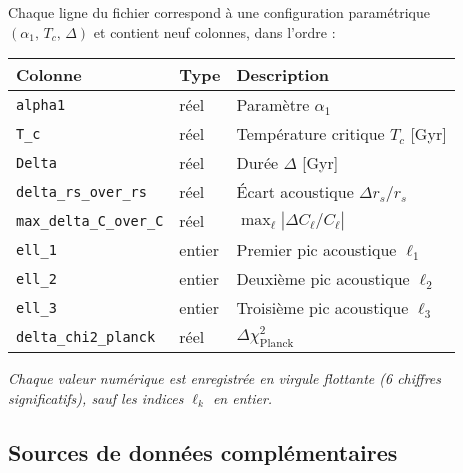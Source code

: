 Chaque ligne du fichier correspond à une configuration paramétrique \((\alpha_{1},\,T_{c},\,\Delta)\) et contient neuf colonnes, dans l’ordre :

\begin{center}
\begin{tabular}{l l l}
\toprule
\textbf{Colonne}               & \textbf{Type} & \textbf{Description}                                                           \\
\midrule
\texttt{alpha1}                & réel          & Paramètre \(\alpha_{1}\)                                                       \\
\texttt{T\_c}                  & réel          & Température critique \(T_{c}\) [Gyr]                                          \\
\texttt{Delta}                 & réel          & Durée \(\Delta\) [Gyr]                                                         \\
\texttt{delta\_rs\_over\_rs}   & réel          & Écart acoustique \(\Delta r_{s}/r_{s}\)                                        \\
\texttt{max\_delta\_C\_over\_C} & réel         & \(\max_{\ell}|\Delta C_{\ell}/C_{\ell}|\)                                       \\
\texttt{ell\_1}                & entier        & Premier pic acoustique \(\ell_{1}\)                                            \\
\texttt{ell\_2}                & entier        & Deuxième pic acoustique \(\ell_{2}\)                                           \\
\texttt{ell\_3}                & entier        & Troisième pic acoustique \(\ell_{3}\)                                          \\
\texttt{delta\_chi2\_planck}   & réel          & \(\Delta\chi^{2}_{\mathrm{Planck}}\)                                           \\
\bottomrule
\end{tabular}
\end{center}

\noindent\emph{Chaque valeur numérique est enregistrée en virgule flottante (6 chiffres significatifs), sauf les indices \(\ell_{k}\) en entier.}

\subsection{Sources de données complémentaires}

